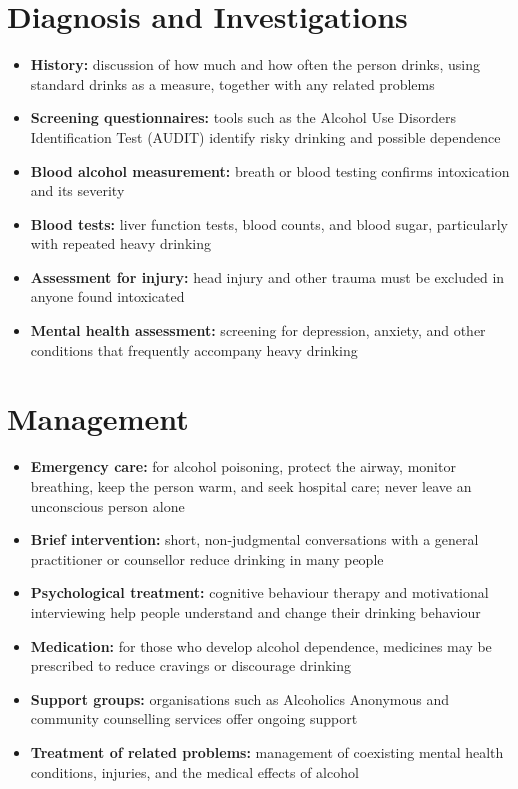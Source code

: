 \section*{Diagnosis and Investigations}
\begin{itemize}
    \item \textbf{History:} discussion of how much and how often the person drinks, using standard drinks as a measure, together with any related problems
    \item \textbf{Screening questionnaires:} tools such as the Alcohol Use Disorders Identification Test (AUDIT) identify risky drinking and possible dependence
    \item \textbf{Blood alcohol measurement:} breath or blood testing confirms intoxication and its severity
    \item \textbf{Blood tests:} liver function tests, blood counts, and blood sugar, particularly with repeated heavy drinking
    \item \textbf{Assessment for injury:} head injury and other trauma must be excluded in anyone found intoxicated
    \item \textbf{Mental health assessment:} screening for depression, anxiety, and other conditions that frequently accompany heavy drinking
\end{itemize}

\section*{Management}
\begin{itemize}
    \item \textbf{Emergency care:} for alcohol poisoning, protect the airway, monitor breathing, keep the person warm, and seek hospital care; never leave an unconscious person alone
    \item \textbf{Brief intervention:} short, non-judgmental conversations with a general practitioner or counsellor reduce drinking in many people
    \item \textbf{Psychological treatment:} cognitive behaviour therapy and motivational interviewing help people understand and change their drinking behaviour
    \item \textbf{Medication:} for those who develop alcohol dependence, medicines may be prescribed to reduce cravings or discourage drinking
    \item \textbf{Support groups:} organisations such as Alcoholics Anonymous and community counselling services offer ongoing support
    \item \textbf{Treatment of related problems:} management of coexisting mental health conditions, injuries, and the medical effects of alcohol
\end{itemize}

